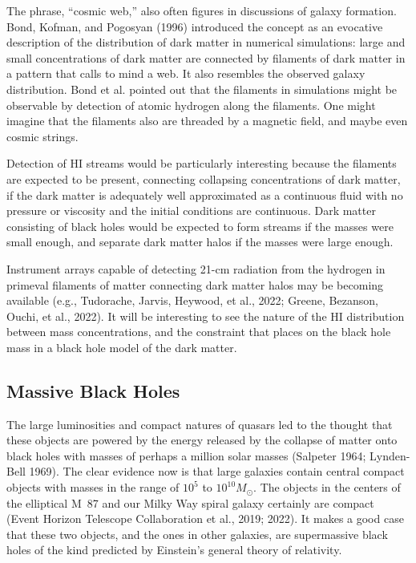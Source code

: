\documentclass[fleqn,usenatbib]{mnras}
\begin{document}
The phrase, ``cosmic web,'' also often figures in discussions of galaxy formation.  Bond, Kofman, and Pogosyan (1996) introduced the concept as an evocative description of the distribution of dark matter in numerical simulations: large and small concentrations of dark matter are connected by filaments of dark matter in a pattern that calls to mind a web. It also resembles the observed galaxy distribution. Bond et al. pointed out that the filaments in simulations might be observable by detection of atomic hydrogen along the filaments. One might imagine that the filaments also are threaded by a magnetic field, and maybe even cosmic strings. 

Detection of HI streams would be particularly interesting because the filaments are expected to be present, connecting collapsing concentrations of dark matter, if the dark matter is adequately well approximated as a continuous fluid with no pressure or viscosity and the initial conditions are continuous. Dark matter consisting of black holes would be expected to form streams if the masses were small enough, and separate dark matter halos if the masses were large enough.

Instrument arrays capable of detecting 21-cm radiation from the hydrogen in  primeval filaments of matter connecting dark matter halos may be becoming available (e.g., Tudorache, Jarvis, Heywood, et al., 2022; Greene, Bezanson, Ouchi, et al., 2022). It will be interesting to see the nature of the H{\small I} distribution between mass concentrations, and the constraint that places on the black hole mass in a black hole model of the dark matter. 

\subsection{Massive Black Holes}\label{massiveblackholes}

The large luminosities and compact natures of quasars led to the thought that these objects are powered by the energy released by the collapse of matter onto black holes with masses of perhaps a million solar masses (Salpeter 1964; Lynden-Bell 1969). The clear evidence now is that large galaxies contain central compact objects with masses in the range of $10^5$ to $10^{10} M_\odot$. The objects in the centers of the elliptical M~87 and our Milky Way spiral galaxy certainly are compact (Event Horizon Telescope Collaboration et al., 2019; 2022). It makes a good case that these two objects, and the ones in other galaxies, are supermassive black holes of the kind predicted by Einstein's general theory of relativity.
\end{document}
